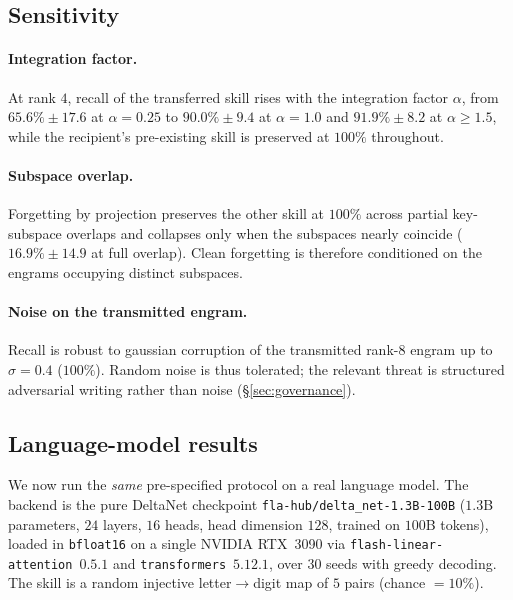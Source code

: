 \documentclass[11pt]{article}
\theoremstyle{definition}
\begin{document}
\subsection{Sensitivity}

\paragraph{Integration factor.}
At rank $4$, recall of the transferred skill rises with the integration factor $\alpha$, from $65.6\% \pm 17.6$ at $\alpha=0.25$ to $90.0\% \pm 9.4$ at $\alpha=1.0$ and $91.9\% \pm 8.2$ at $\alpha\ge 1.5$, while the recipient's pre-existing skill is preserved at $100\%$ throughout.

\paragraph{Subspace overlap.}
Forgetting by projection preserves the other skill at $100\%$ across partial key-subspace overlaps and collapses only when the subspaces nearly coincide ($16.9\% \pm 14.9$ at full overlap). Clean forgetting is therefore conditioned on the engrams occupying distinct subspaces.

\paragraph{Noise on the transmitted engram.}
Recall is robust to gaussian corruption of the transmitted rank-$8$ engram up to $\sigma=0.4$ ($100\%$). Random noise is thus tolerated; the relevant threat is structured adversarial writing rather than noise (\S\ref{sec:governance}).

\subsection{Language-model results}
\label{sec:lm}

We now run the \emph{same} pre-specified protocol on a real language model. The backend is the pure DeltaNet checkpoint \texttt{fla-hub/delta\_net-1.3B-100B} ($1.3$B parameters, $24$ layers, $16$ heads, head dimension $128$, trained on $100$B tokens), loaded in \texttt{bfloat16} on a single NVIDIA RTX~3090 via \texttt{flash-linear-attention}~$0.5.1$ and \texttt{transformers}~$5.12.1$, over $30$ seeds with greedy decoding. The skill is a random injective letter$\to$digit map of $5$ pairs (chance $=10\%$).
\end{document}
